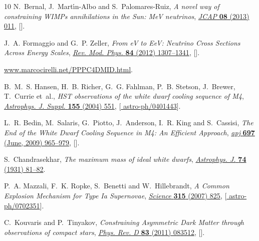 \documentclass[11pt]{article}
\begin{document}
\begin{thebibliography}{10}
N.~Bernal, J.~Mart\'\i{}n-Albo and S.~Palomares-Ruiz, \emph{{A novel way of
  constraining WIMPs annihilations in the Sun: MeV neutrinos}},
  \href{https://doi.org/10.1088/1475-7516/2013/08/011}{\emph{JCAP} {\bfseries
  08} (2013) 011}, [\href{https://arxiv.org/abs/1208.0834}{{}}].

J.~A. Formaggio and G.~P. Zeller, \emph{{From eV to EeV: Neutrino Cross
  Sections Across Energy Scales}},
  \href{https://doi.org/10.1103/RevModPhys.84.1307}{\emph{Rev. Mod. Phys.}
  {\bfseries 84} (2012) 1307--1341},
  [\href{https://arxiv.org/abs/1305.7513}{{}}].

\url{www.marcocirelli.net/PPPC4DMID.html}.

B.~M.~S. Hansen, H.~B. Richer, G.~G. Fahlman, P.~B. Stetson, J.~Brewer,
  T.~Currie et~al., \emph{{HST observations of the white dwarf cooling sequence
  of M4}}, \href{https://doi.org/10.1086/424832}{\emph{Astrophys. J. Suppl.}
  {\bfseries 155} (2004) 551},
  [\href{https://arxiv.org/abs/astro-ph/0401443}{{\ttfamily
  astro-ph/0401443}}].

L.~R. {Bedin}, M.~{Salaris}, G.~{Piotto}, J.~{Anderson}, I.~R. {King} and
  S.~{Cassisi}, \emph{{The End of the White Dwarf Cooling Sequence in M4: An
  Efficient Approach}},
  \href{https://doi.org/10.1088/0004-637X/697/2/965}{\emph{apj} {\bfseries 697}
  (June, 2009) 965--979}, [\href{https://arxiv.org/abs/0903.2839}{{}}].

S.~Chandrasekhar, \emph{{The maximum mass of ideal white dwarfs}},
  \href{https://doi.org/10.1086/143324}{\emph{Astrophys. J.} {\bfseries 74}
  (1931) 81--82}.

P.~A. Mazzali, F.~K. Ropke, S.~Benetti and W.~Hillebrandt, \emph{{A Common
  Explosion Mechanism for Type Ia Supernovae}},
  \href{https://doi.org/10.1126/SCIENCE.1136259}{\emph{Science} {\bfseries 315}
  (2007) 825}, [\href{https://arxiv.org/abs/astro-ph/0702351}{{\ttfamily
  astro-ph/0702351}}].

C.~Kouvaris and P.~Tinyakov, \emph{{Constraining Asymmetric Dark Matter through
  observations of compact stars}},
  \href{https://doi.org/10.1103/PhysRevD.83.083512}{\emph{Phys. Rev. D}
  {\bfseries 83} (2011) 083512},
  [\href{https://arxiv.org/abs/1012.2039}{{}}].


\end{thebibliography}
\end{document}
